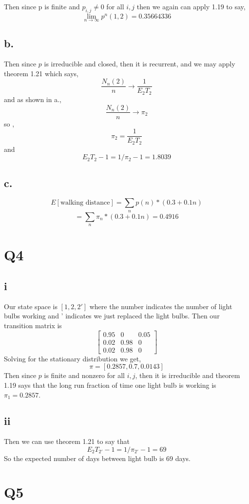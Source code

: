 \documentclass{article}
\begin{document}
Then since p is finite and $p_{i,j} \neq 0$ for all $i,j$ then we again can apply 1.19 to say,  
\[
\lim_{n \to \infty} p^n(1,2) = 0.35664336
\]
\subsection*{b.}
Then since $p$ is irreducible and closed, then it is recurrent, and we may apply theorem 1.21 which says,
\[
\frac{N_n(2)}{n} \rightarrow \frac{1}{E_2T_2}
\]
and as shown in a.,
\[
\frac{N_n(2)}{n} \rightarrow \pi_2
\]
so ,
\[
\pi_2 = \frac{1}{E_2T_2}
\]
and
\[
E_2T_2 -1 = 1/\pi_2 -1 = 1.8039
\]
\subsection*{c.}
\[
E[\text{walking distance}] = \sum_{n} p(n) * (0.3 + 0.1n)
\]
\[
= \sum_{n} \pi_n * (0.3 + 0.1n) = 0.4916
\]

\section*{Q4}
\subsection*{i}
Our state space is $[1,2,2']$ where the number indicates the number of light bulbs working and ' indicates we just replaced  the light bulbs.
Then our transition matrix is
\[
\begin{bmatrix}
0.95 & 0 & 0.05\\
0.02 & 0.98 & 0\\
0.02 & 0.98 & 0 
\end{bmatrix}
\]
Solving for the stationary distribution we get,
\[
\pi = [ 0.2857,  0.7       ,  0.0143]
\]
Then since $p$ is finite and nonzero for all $i,j$, then it is irreducible and theorem 1.19 says that the long run fraction of time one light bulb is working is $\pi_1 = 0.2857$. 

\subsection*{ii}
Then we can use theorem 1.21 to say that
\[
E_2T_{2'} - 1 = 1/\pi_{2'} -1 = 69
\]
So the expected number of days between light bulb is 69 days.

\section*{Q5}
\end{document}
